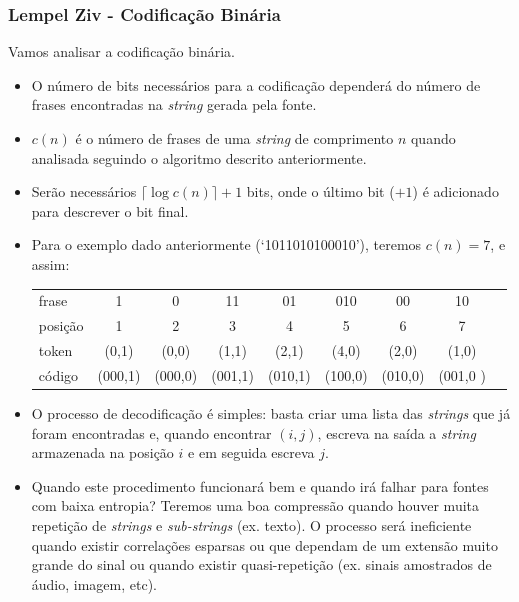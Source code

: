 \begin{frame}[allowframebreaks]
  \frametitle{Lempel Ziv - Codificação Binária}

  Vamos analisar a codificação binária.
  \begin{itemize}
  \item O número de bits necessários para a codificação dependerá do número de frases encontradas
	na \textit{string} gerada pela fonte.
  \item $c(n)$ é o número de frases de uma \textit{string} de comprimento $n$ quando analisada
	seguindo o algoritmo descrito anteriormente.
  \item Serão necessários $\lceil \log c(n) \rceil + 1$ bits, onde o último bit ($+1$) é adicionado 
	para descrever o bit final.
  \item Para o exemplo dado anteriormente (`1011010100010'), teremos $c(n)=7$, e assim:
	{ \scriptsize
        \begin{tabular}{lcccccccc} 
        frase   & 1       & 0       & 11      & 01      & 010     & 00      & 10    \\
        posição & 1       & 2       & 3       & 4       & 5       & 6       & 7     \\
        token   & (0,1)   & (0,0)   & (1,1)   & (2,1)   & (4,0)   & (2,0)   & (1,0) \\
	código  & (000,1) & (000,0) & (001,1) & (010,1) & (100,0) & (010,0) & (001,0 ) 
        \end{tabular}
	}
  \item O processo de decodificação é simples: basta criar uma lista das \textit{strings}
	que já foram encontradas e, quando encontrar $(i,j)$, escreva na saída a \textit{string}
	armazenada na posição $i$ e em seguida escreva $j$.
  \item Quando este procedimento funcionará bem e quando irá falhar para fontes com baixa entropia?
	Teremos uma boa compressão quando houver muita repetição de \textit{strings} e \textit{sub-strings} (ex. texto).
	O processo será ineficiente quando existir correlações esparsas ou que dependam de um extensão muito grande do sinal
	ou quando existir quasi-repetição (ex. sinais amostrados de áudio, imagem, etc).
  \end{itemize}
\end{frame}
